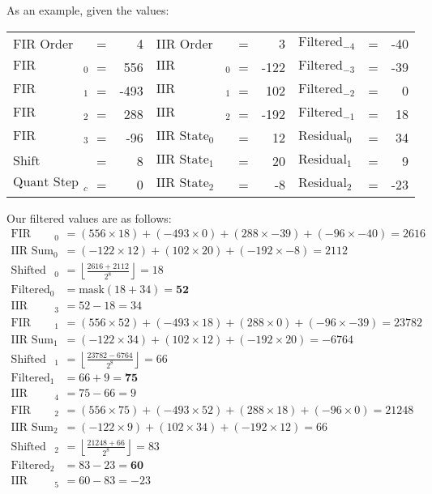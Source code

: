 \clearpage

As an example, given the values:
\begin{table}[h]
\begin{tabular}{l c r l c r l c r}
FIR Order & = & 4 &
IIR Order & = & 3 &
$\text{Filtered}_{-4}$ & = & -40 \\
$\text{FIR Coefficient}_0$ & = & 556 &
$\text{IIR Coefficient}_0$ & = & -122 &
$\text{Filtered}_{-3}$ & = & -39 \\
$\text{FIR Coefficient}_1$ & = & -493 &
$\text{IIR Coefficient}_1$ & = & 102 &
$\text{Filtered}_{-2}$ & = & 0 \\
$\text{FIR Coefficient}_2$ & = & 288 &
$\text{IIR Coefficient}_2$ & = & -192 &
$\text{Filtered}_{-1}$ & = & 18 \\
$\text{FIR Coefficient}_3$ & = & -96 &
$\text{IIR State}_0$ & = & 12 &
$\text{Residual}_0$ & = & 34 \\
$\text{Shift}$ & = & 8 &
$\text{IIR State}_1$ & = & 20 &
$\text{Residual}_1$ & = & 9 \\
$\text{Quant Step Size}_c$ & = & 0 &
$\text{IIR State}_2$ & = & -8 &
$\text{Residual}_2$ & = & -23 \\
\end{tabular}
\end{table}

Our filtered values are as follows:
\begin{align*}
\text{FIR Sum}_0 &= (556 \times 18) + (-493 \times 0) + (288 \times -39) + (-96 \times -40) = 2616 \\
\text{IIR Sum}_0 &= (-122 \times 12) + (102 \times 20) + (-192 \times -8) = 2112 \\
\text{Shifted Sum}_0 &= \left\lfloor\frac{2616 + 2112}{2 ^ 8}\right\rfloor = 18 \\
\text{Filtered}_0 &= \text{mask}(18 + 34) = \textbf{52} \\
\text{IIR State}_3 &= 52 - 18 = 34 \\
\text{FIR Sum}_1 &= (556 \times 52) + (-493 \times 18) + (288 \times 0) + (-96 \times -39) = 23782 \\
\text{IIR Sum}_1 &= (-122 \times 34) + (102 \times 12) + (-192 \times 20) = -6764 \\
\text{Shifted Sum}_1 &= \left\lfloor\frac{23782 - 6764}{2 ^ 8}\right\rfloor = 66 \\
\text{Filtered}_1 &= 66 + 9 = \textbf{75} \\
\text{IIR State}_4 &= 75 - 66 = 9 \\
\text{FIR Sum}_2 &= (556 \times 75) + (-493 \times 52) + (288 \times 18) + (-96 \times 0) = 21248 \\
\text{IIR Sum}_2 &= (-122 \times 9) + (102 \times 34) + (-192 \times 12) = 66 \\
\text{Shifted Sum}_2 &= \left\lfloor\frac{21248 + 66}{2 ^ 8}\right\rfloor = 83 \\
\text{Filtered}_2 &= 83 - 23 = \textbf{60} \\
\text{IIR State}_5 &= 60 - 83 = -23 \\
\end{align*}

